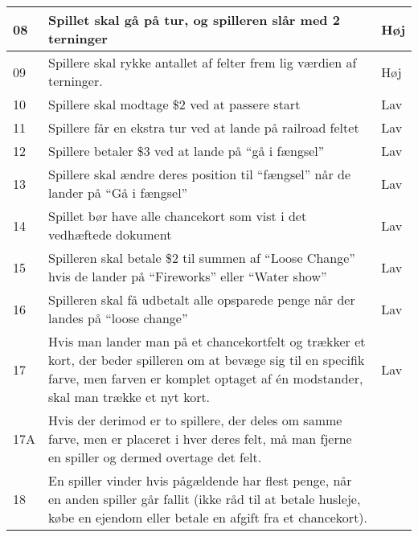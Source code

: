 \begin{table}[H]
\begin{tabular}{ |p{0.5cm}|p{10cm}|p{2cm}| }
       \hline
       08 & Spillet skal gå på tur, og spilleren slår med 2 terninger & Høj \\
       \hline
       09 & Spillere skal rykke antallet af felter frem lig værdien af terninger. & Høj \\
       \hline
       10 & Spillere skal modtage \$2 ved at passere start & Lav \\
       \hline
       11 & Spillere får en ekstra tur ved at lande på railroad feltet & Lav\\
       \hline
       12 & Spillere betaler \$3 ved at lande på “gå i fængsel” & Lav\\
       \hline
       13 & Spillere skal ændre deres position til “fængsel” når de lander på “Gå i fængsel” & Lav\\
       \hline
       14 & Spillet bør have alle chancekort som vist i det vedhæftede dokument & Lav \\
       \hline
       15 & Spilleren skal betale \$2 til summen af “Loose Change” hvis de lander på “Fireworks” eller “Water show” & Lav \\
       \hline
       16 & Spilleren skal få udbetalt alle opsparede penge når der landes på “loose change” & Lav\\
       \hline
       17 & Hvis man lander man på et chancekortfelt og trækker et kort, der beder spilleren om at bevæge sig til en specifik farve, men farven er komplet optaget af én modstander, skal man trække et nyt kort. & Lav \\
       17A & Hvis der derimod er to spillere, der deles om samme farve, men er placeret i hver deres felt, må man fjerne en spiller og dermed overtage det felt. & \\
       \hline
       18 & En spiller vinder hvis pågældende har flest penge, når en anden spiller går fallit (ikke råd til at betale husleje, købe en ejendom eller betale en afgift fra et chancekort). \\
       \hline
   \end{tabular}
 \end{table}